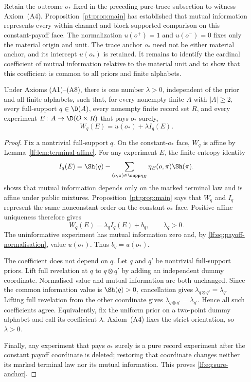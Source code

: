 Retain the outcome $o_\ast$ fixed in the preceding pure-trace subsection to
witness Axiom~\textup{(A4)}.  Proposition~\ref{pt:prop:main} has established
that mutual information represents every within-channel and block-supported
comparison on this constant-payoff face.
The normalization $u(o^+)=1$ and $u(o^-)=0$ fixes only the material origin
and unit.  The trace anchor $o_\ast$ need not be either material anchor, and
its intercept $u(o_\ast)$ is retained.  It remains to identify the cardinal
coefficient of mutual information relative to the material unit and to show
that this coefficient is common to all priors and finite alphabets.

\begin{lemma}\label{lf:lem:trace-scale}
Under Axioms \textup{(A1)--(A8)}, there is one number $\lambda>0$, independent
of the prior and all finite alphabets, such that, for every nonempty finite
$A$ with $\lvert A\rvert\ge2$, every full-support $q\in\D(A)$, every nonempty
finite record set $R$, and every experiment
$E:A\to\D(O\times R)$ that pays $o_\ast$ surely,
\begin{equation}
W_q(E)=u(o_\ast)+\lambda I_q(E).
\label{lf:eq:sure-anchor}
\end{equation}
\end{lemma}

\begin{proof}
Fix a nontrivial full-support $q$.  On the constant-$o_\ast$ face, $W_q$ is
affine by Lemma~\ref{lf:lem:terminal-affine}.  For any experiment $E$, the
finite entropy identity
\begin{equation}
I_q(E)=\Sh(q)-\sum_{(o,\pi)\in\supp\eta_E}
\eta_E(o,\pi)\Sh(\pi).
\label{lf:eq:posterior-entropy}
\end{equation}
shows that mutual information depends only on the marked terminal law and is
affine under public mixtures.  Proposition~\ref{pt:prop:main} says that $W_q$ and
$I_q$ represent the same nonconstant order on the constant-$o_\ast$ face.
Positive-affine uniqueness therefore gives
\[
W_q(E)=\lambda_q I_q(E)+b_q,
\qquad \lambda_q>0.
\]
The uninformative experiment has mutual information zero and, by
\eqref{lf:eq:payoff-normalisation}, value $u(o_\ast)$.  Thus $b_q=u(o_\ast)$.

The coefficient does not depend on $q$.  Let $q$ and $q'$ be nontrivial
full-support priors.  Lift full revelation at $q$ to $q\otimes q'$ by adding an
independent dummy coordinate.  Normalised value and mutual information are both
unchanged.  Since the common information value is $\Sh(q)>0$, cancellation
gives $\lambda_{q\otimes q'}=\lambda_q$.  Lifting full revelation from the
other coordinate gives $\lambda_{q\otimes q'}=\lambda_{q'}$.  Hence all such
coefficients agree.  Equivalently, fix the uniform prior on a two-point dummy
alphabet and call its coefficient $\lambda$.  Axiom~\textup{(A4)} fixes the
strict orientation, so $\lambda>0$.

Finally, any experiment that pays $o_\ast$ surely is a pure record experiment
after the constant payoff coordinate is deleted; restoring that coordinate
changes neither its marked terminal law nor its mutual information.  This
proves \eqref{lf:eq:sure-anchor}.
\end{proof}


